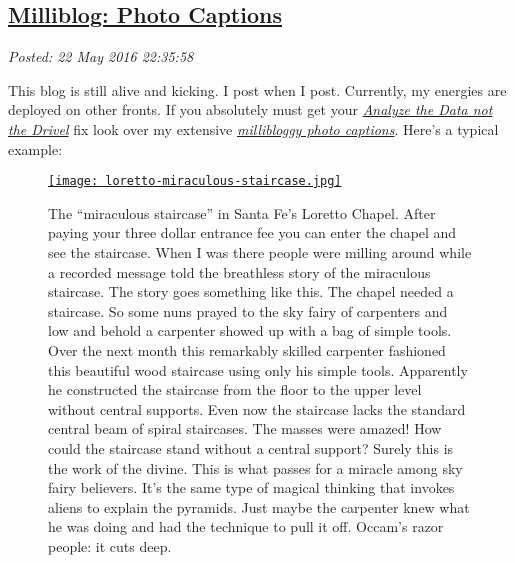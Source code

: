 %

\subsection*{\href{https://bakerjd99.wordpress.com/2016/05/22/milliblog-photo-captions/}{Milliblog: Photo Captions}}


\noindent\emph{Posted: 22 May 2016 22:35:58}
\vspace{6pt}

This blog is still alive and kicking. I post when I post. Currently, my
energies are deployed on other fronts. If you absolutely must get your
\emph{\href{https://bakerjd99.wordpress.com/}{Analyze the Data not the
Drivel}} fix look over my extensive
\emph{\href{https://conceptcontrol.smugmug.com/}{millibloggy photo
captions}}. Here's a typical example:

\captionsetup[figure]{labelformat=empty}
\begin{figure}[htbp]
\centering
\href{https://conceptcontrol.smugmug.com/Places/USA-and-Canada/New-Mexico-Montage/i-D79vhKg/A}{\texttt{[image: loretto-miraculous-staircase.jpg]}}
\caption{The ``miraculous staircase'' in Santa Fe's Loretto Chapel. After paying
your three dollar entrance fee you can enter the chapel and see the
staircase. When I was there people were milling around while a recorded
message told the breathless story of the miraculous staircase. The story
goes something like this. The chapel needed a staircase. So some nuns
prayed to the sky fairy of carpenters and low and behold a carpenter
showed up with a bag of simple tools. Over the next month this
remarkably skilled carpenter fashioned this beautiful wood staircase
using only his simple tools. Apparently he constructed the staircase
from the floor to the upper level without central supports. Even now the
staircase lacks the standard central beam of spiral staircases. The
masses were amazed! How could the staircase stand without a central
support? Surely this is the work of the divine. This is what passes for
a miracle among sky fairy believers. It's the same type of magical
thinking that invokes aliens to explain the pyramids. Just maybe the
carpenter knew what he was doing and had the technique to pull it off.
Occam's razor people: it cuts deep.}
\label{fig:5249X0}
\end{figure}



%